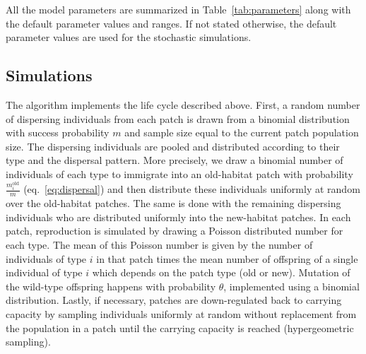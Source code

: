 \documentclass[a4paper,11pt]{article}
\newcommand{\chg}[1]{\textcolor{change}{#1}}
\begin{document}
All the model parameters are summarized in Table~\ref{tab:parameters} along with the default parameter values and ranges. If not stated otherwise, the default parameter values are used for the stochastic simulations. 

\subsection*{Simulations}
The algorithm implements the life cycle described above. First, a random number of dispersing individuals \chg{from each patch} is drawn from a binomial distribution with success probability $m$ and sample size equal to the \chg{current patch} population size. The dispersing individuals \chg{are pooled and} distributed according to their type and the dispersal pattern. \chg{More precisely, we draw a binomial number of individuals of each type to immigrate into an old-habitat patch with probability $\frac{m_i^{\text{old}}}{m}$ (eq.~\eqref{eq:dispersal}) and then distribute these individuals uniformly at random over the old-habitat patches. The same is done with the remaining dispersing individuals who are distributed uniformly into the new-habitat patches.} \chg{In each patch, reproduction is simulated by drawing a Poisson distributed number for each type. The mean of this Poisson number is given by the number of individuals of type $i$ in that patch times the mean number of offspring of a single individual of type $i$ which depends on the patch type (old or new).} 
Mutation of the wild-type \chg{offspring} \chg{happens} with \chg{probability} $\theta$, implemented using a binomial distribution. Lastly, if necessary, \chg{patches are down-regulated back to carrying capacity by sampling individuals uniformly at random without replacement from the population in a patch until the carrying capacity is reached (hypergeometric sampling).} 
\end{document}
